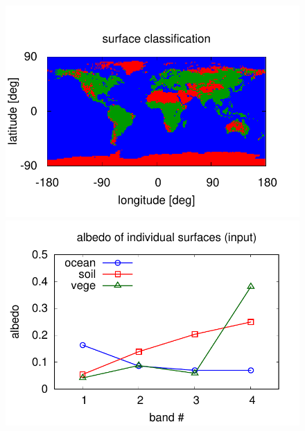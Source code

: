 \documentclass[iop,numberedappendix,apj,]{emulateapj}
\begin{document}
\begin{figure}[hb!]
    \begin{minipage}{0.5\hsize}
    \begin{center}
\includegraphics[width=\hsize]{IGBP_simplemap.pdf}
    \end{center}
     \end{minipage}
  \begin{minipage}{0.5\hsize}
    \begin{center}
    \includegraphics[width=\hsize]{mockdata_quadrature_bandsp.pdf}
    \end{center}
\end{minipage}
  \begin{minipage}{0.5\hsize}
    \begin{center}

\end{center}
\end{minipage}
\end{figure}
\end{document}
